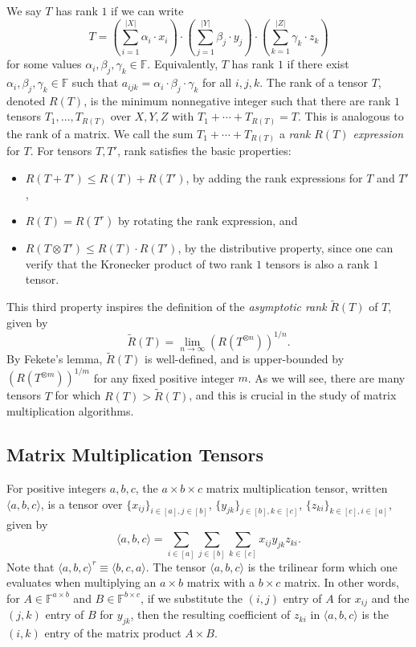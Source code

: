 \PassOptionsToPackage{shortlabels}{enumitem}\documentclass[10pt,a4paper]{article}
\newcommand{\F}{\mathbb{F}}
\begin{document}
We say $T$ has rank $1$ if we can write $$T = \left( \sum_{i=1}^{|X|} \alpha_i \cdot x_i \right) \cdot \left( \sum_{j=1}^{|Y|} \beta_j \cdot y_j \right) \cdot \left( \sum_{k=1}^{|Z|} \gamma_k \cdot z_k \right)$$ for some values $\alpha_i, \beta_j, \gamma_k \in \F$. Equivalently, $T$ has rank $1$ if there exist $\alpha_i, \beta_j, \gamma_k \in \F$  such that $a_{ijk} = \alpha_i \cdot \beta_j \cdot \gamma_k$ for all $i,j,k$. The rank of a tensor $T$, denoted $R(T)$, is the minimum nonnegative integer such that there are rank $1$ tensors $T_1, \ldots, T_{R(T)}$ over $X,Y,Z$ with $T_1 + \cdots + T_{R(T)} = T$. This is analogous to the rank of a matrix. We call the sum $T_1 + \cdots + T_{R(T)}$ a \emph{rank $R(T)$ expression} for $T$. For tensors $T,T'$, rank satisfies the basic properties:
\begin{itemize}
    \item $R(T+T') \leq R(T) + R(T')$, by adding the rank expressions for $T$ and $T'$,
    \item $R(T)=R(T^r)$ by rotating the rank expression, and
    \item $R(T \otimes T') \leq R(T) \cdot R(T')$, by the distributive property, since one can verify that the Kronecker product of two rank $1$ tensors is also a rank $1$ tensor. 
\end{itemize}
This third property inspires the definition of the \emph{asymptotic rank} $\tilde{R}(T)$ of $T$, given by $$\tilde{R}(T) = \lim_{n \to \infty} (R(T^{\otimes n}))^{1/n}.$$ By Fekete's lemma, $\tilde{R}(T)$ is well-defined, and is upper-bounded by $(R(T^{\otimes m}))^{1/m}$ for any fixed positive integer $m$. As we will see, there are many tensors $T$ for which $R(T) > \tilde{R}(T)$, and this is crucial in the study of matrix multiplication algorithms.

\subsection{Matrix Multiplication Tensors}

For positive integers $a,b,c$, the $a \times b \times c$ matrix multiplication tensor, written $\langle a,b,c \rangle$, is a tensor over $\{x_{ij}\}_{i \in [a], j \in [b]}$, $\{y_{jk}\}_{j \in [b], k \in [c]}$, $\{z_{ki}\}_{k \in [c], i \in [a]}$, given by $$\langle a,b,c \rangle = \sum_{i \in [a]} \sum_{j \in [b]} \sum_{k \in [c]} x_{ij} y_{jk} z_{ki}.$$
Note that $\langle a,b,c \rangle^r \equiv \langle b,c,a \rangle$. The tensor $\langle a,b,c \rangle$ is the trilinear form which one evaluates when multiplying an $a \times b$ matrix with a $b \times c$ matrix. In other words, for $A \in \F^{a \times b}$ and $B \in \F^{b \times c}$, if we substitute the $(i,j)$ entry of $A$ for $x_{ij}$ and the $(j,k)$ entry of $B$ for $y_{jk}$, then the resulting coefficient of $z_{ki}$ in $\langle a,b,c \rangle$ is the $(i,k)$ entry of the matrix product $A \times B$.
\end{document}
